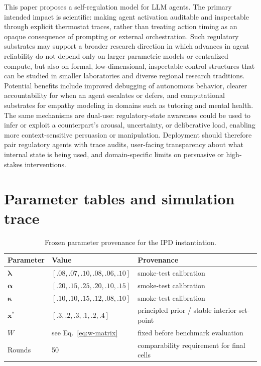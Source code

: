 \documentclass{article}
\begin{document}
This paper proposes a self-regulation model for LLM agents. The primary intended impact is scientific: making agent activation auditable and inspectable through explicit thermostat traces, rather than treating action timing as an opaque consequence of prompting or external orchestration. Such regulatory substrates may support a broader research direction in which advances in agent reliability do not depend only on larger parametric models or centralized compute, but also on formal, low-dimensional, inspectable control structures that can be studied in smaller laboratories and diverse regional research traditions. Potential benefits include improved debugging of autonomous behavior, clearer accountability for when an agent escalates or defers, and computational substrates for empathy modeling in domains such as tutoring and mental health. The same mechanisms are dual-use: regulatory-state awareness could be used to infer or exploit a counterpart's arousal, uncertainty, or deliberative load, enabling more context-sensitive persuasion or manipulation. Deployment should therefore pair regulatory agents with trace audits, user-facing transparency about what internal state is being used, and domain-specific limits on persuasive or high-stakes interventions.




\newpage
\appendix
\makeatletter
{}
\makeatother
\renewcommand{\thefigure}{\thesection.\arabic{figure}}
\renewcommand{\thetable}{\thesection.\arabic{table}}
\renewcommand{\theequation}{\thesection.\arabic{equation}}
\onecolumn
\section{Parameter tables and simulation trace}\label{app:parameters}

\begin{table}[!h]
\caption{Frozen parameter provenance for the IPD instantiation.}
\label{tab:params}
\centering
\small
\begin{tabular}{p{}p{}p{}}
\toprule
Parameter & Value & Provenance \\
\midrule
$\boldsymbol{\lambda}$ & $[.08,.07,.10,.08,.06,.10]$ & smoke-test calibration \\
$\boldsymbol{\alpha}$ & $[.20,.15,.25,.20,.10,.15]$ & smoke-test calibration \\
$\boldsymbol{\kappa}$ & $[.10,.10,.15,.12,.08,.10]$ & smoke-test calibration \\
$\mathbf{x}^{*}$ & $[.3,.2,.3,.1,.2,.4]$ & principled prior / stable interior set-point \\
$W$ & see Eq.~\eqref{eq:w-matrix} & fixed before benchmark evaluation \\
Rounds & 50 & comparability requirement for final cells \\
\bottomrule
\end{tabular}
\end{table}
\end{document}
